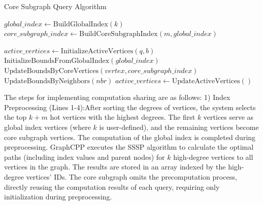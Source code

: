\documentclass[lettersize,journal]{IEEEtran} %
\begin{document}
\begin{algorithm}
    \caption{Core Subgraph Query Algorithm}
    \begin{algorithmic}[1]
    
    \State $global\_index \gets \text{BuildGlobalIndex}(k)$ 
    \State $core\_subgraph\_index \gets \text{BuildCoreSubgraphIndex}(m, global\_index)$ 
    
        \State $active\_vertices \gets \text{InitializeActiveVertices}(q, b)$ 
        \State $\text{InitializeBoundsFromGlobalIndex}(global\_index)$ 
                    \State $\text{UpdateBoundsByCoreVertices}(vertex, core\_subgraph\_index)$
                \Else
                     
                        \State $\text{UpdateBoundsByNeighbors}(nbr)$
                    \EndFor
                \EndIf
            \EndFor
            \State $active\_vertices \gets \text{UpdateActiveVertices}()$
        \EndWhile
    \EndProcedure
    
    \end{algorithmic}
    \end{algorithm}

The steps for implementing computation sharing are as follows:
1) Index Preprocessing (Lines 1-4):After sorting the degrees of vertices, the system selects the top $k+m$ hot vertices with the highest degrees. The first $k$ vertices serve as global index vertices (where $k$ is user-defined), and the remaining vertices become core subgraph vertices. The computation of the global index is completed during preprocessing. GraphCPP executes the SSSP algorithm to calculate the optimal paths (including index values and parent nodes) for $k$ high-degree vertices to all vertices in the graph. The results are stored in an array indexed by the high-degree vertices' IDs. The core subgraph omits the precomputation process, directly reusing the computation results of each query, requiring only initialization during preprocessing.
\end{document}
